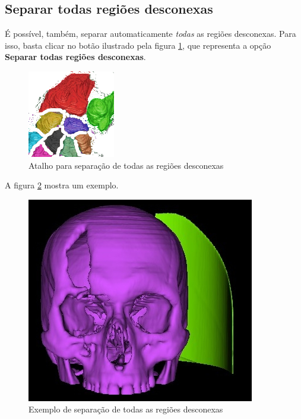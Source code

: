\subsection{Separar todas regiões desconexas}

É possível, também, separar automaticamente \textit{todas} as regiões desconexas. Para
isso, basta clicar no botão ilustrado pela figura \ref{fig:connectivity_split_all}, que
representa a opção \textbf{Separar todas regiões desconexas}.

\begin{figure}[!htb]
\centering
\includegraphics[scale=0.2]{../user_guide_figures/icons/connectivity_split_all.png}
\caption{Atalho para separação de todas as regiões desconexas}
\label{fig:connectivity_split_all}
\end{figure}

A figura \ref{fig:extrac_most_region_4} mostra um exemplo.

\begin{figure}[!htb]
\centering
\includegraphics[scale=0.3]{../user_guide_figures/invesalius_screen/surface_extract_most_region_4.jpg}
\caption{Exemplo de separação de todas as regiões desconexas}
\label{fig:extrac_most_region_4}
\end{figure}

